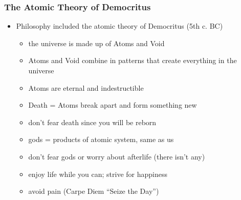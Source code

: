 \documentclass[12pt, twoside]{article}
\begin{document}
\subsubsection{The Atomic Theory of Democritus}
\begin{itemize}
\item Philosophy included the atomic theory of Democritus (5th c. BC)
	\begin{itemize}
	\item the universe is made up of Atoms and Void
	\item Atoms and Void combine in patterns that create everything in the universe
	\item Atoms are eternal and indestructible
	\item Death = Atoms break apart and form something new
	\item don’t fear death since you will be reborn
	\item gods = products of atomic system, same as us
	\item don't fear gods or worry about afterlife (there isn't any)
	\item enjoy life while you can; strive for happiness
	\item avoid pain (Carpe Diem “Seize the Day”)
	\end{itemize}
\end{itemize}
\end{document}
